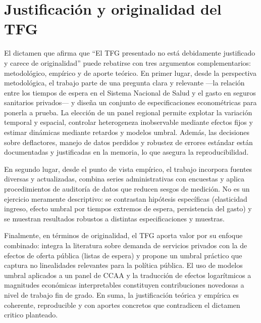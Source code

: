 
\section{Justificación y originalidad del TFG}

El dictamen que afirma que “El TFG presentado no está debidamente justificado y
carece de originalidad” puede rebatirse con tres argumentos complementarios:
metodológico, empírico y de aporte teórico. En primer lugar, desde la perspectiva
metodológica, el trabajo parte de una pregunta clara y relevante —la relación entre
los tiempos de espera en el Sistema Nacional de Salud y el gasto en seguros
sanitarios privados— y diseña un conjunto de especificaciones econométricas para
ponerla a prueba. La elección de un panel regional permite explotar la variación
temporal y espacial, controlar heterogeneza inobservable mediante efectos fijos
y estimar dinámicas mediante retardos y modelos umbral. Además, las decisiones
sobre deflactores, manejo de datos perdidos y robustez de errores estándar están
documentadas y justificadas en la memoria, lo que asegura la reproducibilidad.

En segundo lugar, desde el punto de vista empírico, el trabajo incorpora fuentes
diversas y actualizadas, combina series administrativas con encuestas y aplica
procedimientos de auditoría de datos que reducen sesgos de medición. No es un
ejercicio meramente descriptivo: se contrastan hipótesis específicas (elasticidad
ingreso, efecto umbral por tiempos extremos de espera, persistencia del gasto)
y se muestran resultados robustos a distintas especificaciones y muestras.

Finalmente, en términos de originalidad, el TFG aporta valor por su enfoque
combinado: integra la literatura sobre demanda de servicios privados con la de
efectos de oferta pública (listas de espera) y propone un umbral práctico que
captura no linealidades relevantes para la política pública. El uso de modelos
umbral aplicados a un panel de CCAA y la traducción de efectos logarítmicos a
magnitudes económicas interpretables constituyen contribuciones novedosas a
nivel de trabajo fin de grado. En suma, la justificación teórica y empírica es
coherente, reproducible y con aportes concretos que contradicen el dictamen
critico planteado.


